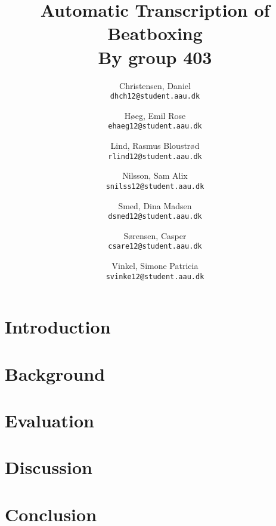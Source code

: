 \documentclass[12pt,a4paper]{report}
\author{
	Christensen, Daniel\\
	\texttt{dhch12@student.aau.dk}
	\and
	Høeg, Emil Rose \\
	\texttt{ehaeg12@student.aau.dk}
	\and
	Lind, Rasmus Bloustrød\\
	\texttt{rlind12@student.aau.dk}
	\and
	Nilsson, Sam Alix \\
	\texttt{snilss12@student.aau.dk}
	\and
	Smed, Dina Madsen\\
	\texttt{dsmed12@student.aau.dk}
	\and
	Sørensen, Casper\\
	\texttt{csare12@student.aau.dk}
	\and
	Vinkel, Simone Patricia \\
	\texttt{svinke12@student.aau.dk}
}
\title{{\LARGE \textbf{Automatic Transcription of Beatboxing}} \\
{{\Large By group 403}}}
\begin{document}
\maketitle
\tableofcontents
\chapter{Introduction}

\chapter{Background}


%








\chapter{Evaluation}
\chapter{Discussion}
\chapter{Conclusion}


\end{document}
